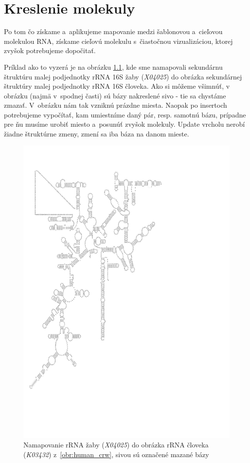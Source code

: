 \newcommand{\degree}{\ensuremath{^{\circ}}}

\chapter{Kreslenie molekuly}

Po tom čo získame a~aplikujeme mapovanie medzi šablonovou a~cieľovou molekulou RNA,
získame cieľovú molekulu s~čiastočnou vizualizáciou, ktorej zvyšok potrebujeme dopočitať.

Príklad ako to vyzerá je na obrázku \ref{obr:frog_to_human}, kde sme
namapovali sekundárnu štruktúru malej podjednotky rRNA 16S žaby (\textit{X04025}) do
obrázka sekundárnej štruktúry malej podjednotky rRNA 16S človeka.
Ako si môžeme všimnúť, v obrázku (najmä v~spodnej časti) sú bázy nakreslené
sivo - tie sa chystáme zmazať. V~obrázku nám tak vzniknú prázdne miesta.
Naopak po insertoch potrebujeme vypočítať, kam umiestníme daný pár,
resp. samotnú bázu, prípadne pre ňu musíme urobiť miesto a~posunúť zvyšok
molekuly. Update vrcholu nerobí žiadne štruktúrne zmeny, zmení sa iba
báza na danom mieste.

\begin{figure}
  \centering
  \includegraphics[clip, trim=0 5cm 6cm 2cm, width=1\textwidth]{../img/african_frog-to-human-mapped}
  \caption{Namapovanie rRNA žaby (\textit{X04025}) do obrázka rRNA človeka (\textit{K03432}) z~\ref{obr:human_crw}, sivou sú označené mazané bázy}
  \label{obr:frog_to_human}
\end{figure}

